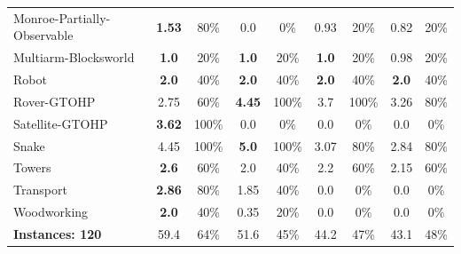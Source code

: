 \begin{table}
\begin{adjustbox}{angle=90}
\begin{tabular}{|l|cc|cc|cc|cc|}
	Monroe-Partially-Observable & \textbf{1.53} & 80\%  & 0.0 & 0\%  & 0.93 & 20\%  & 0.82 & 20\%  \\
	Multiarm-Blocksworld & \textbf{1.0} & 20\%  & \textbf{1.0} & 20\%  & \textbf{1.0} & 20\%  & 0.98 & 20\%  \\
	Robot & \textbf{2.0} & 40\%  & \textbf{2.0} & 40\%  & \textbf{2.0} & 40\%  & \textbf{2.0} & 40\%  \\
	Rover-GTOHP & 2.75 & 60\%  & \textbf{4.45} & 100\%  & 3.7 & 100\%  & 3.26 & 80\%  \\
	Satellite-GTOHP & \textbf{3.62} & 100\%  & 0.0 & 0\%  & 0.0 & 0\%  & 0.0 & 0\%  \\
	Snake & 4.45 & 100\%  & \textbf{5.0} & 100\%  & 3.07 & 80\%  & 2.84 & 80\%  \\
	Towers & \textbf{2.6} & 60\%  & 2.0 & 40\%  & 2.2 & 60\%  & 2.15 & 60\%  \\
	Transport & \textbf{2.86} & 80\%  & 1.85 & 40\%  & 0.0 & 0\%  & 0.0 & 0\%  \\
	Woodworking & \textbf{2.0} & 40\%  & 0.35 & 20\%  & 0.0 & 0\%  & 0.0 & 0\%  \\
	\hline
	\textbf{Instances: 120} & 59.4 & 64\% & 51.6 & 45\% & 44.2 & 47\% & 43.1 & 48\% \\
	\hline
\end{tabular}

	\end{adjustbox}
\end{table}

